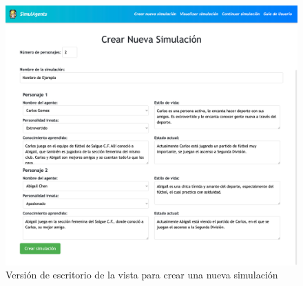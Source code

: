 \begin{figure}[h]
	\centering
	\includegraphics[width = 1\textwidth]{Imagenes/Vectorial/crearSimu.png}
	\caption{Versión de escritorio de la vista para crear una nueva simulación}
	\label{fig:vistaCrearSimulacion}
\end{figure}

